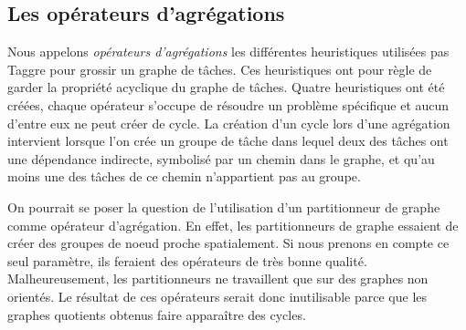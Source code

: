 \subsection{Les opérateurs d'agrégations}
Nous appelons {\em opérateurs d'agrégations} les différentes heuristiques utilisées pas Taggre pour grossir un graphe de tâches.
%
Ces heuristiques ont pour règle de garder la propriété acyclique du graphe de tâches.
%
Quatre heuristiques ont été créées, chaque opérateur s'occupe de résoudre un problème spécifique et aucun d'entre eux ne peut créer de cycle.
%
La création d'un cycle lors d'une agrégation intervient lorsque l'on crée un groupe de tâche dans lequel deux des tâches ont une dépendance indirecte, symbolisé par un chemin dans le graphe, et qu'au moins une des tâches de ce chemin n'appartient pas au groupe.




On pourrait se poser la question de l'utilisation d'un partitionneur de graphe comme opérateur d'agrégation.
%
En effet, les partitionneurs de graphe essaient de créer des groupes de noeud proche spatialement.
%
Si nous prenons en compte ce seul paramètre, ils feraient des opérateurs de très bonne qualité.
%
Malheureusement, les partitionneurs ne travaillent que sur des graphes non orientés.
%
Le résultat de ces opérateurs serait donc inutilisable parce que les graphes quotients obtenus faire apparaître des cycles.
